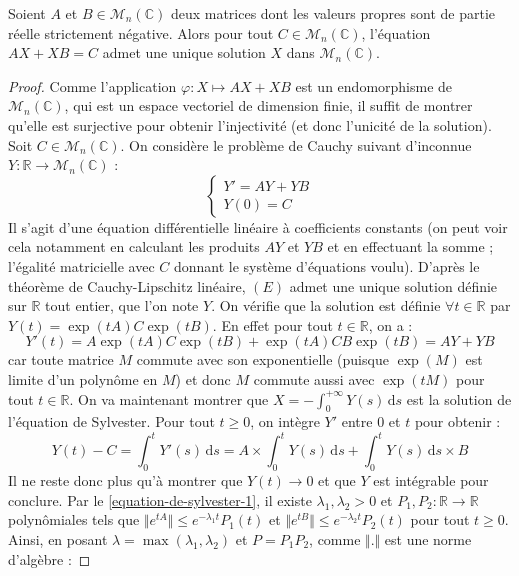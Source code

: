   
  \begin{theorem}
    Soient $A$ et $B \in \mathcal{M}_n(\mathbb{C})$ deux matrices dont les valeurs propres sont de partie réelle strictement négative. Alors pour tout $C \in \mathcal{M}_n(\mathbb{C})$, l'équation $AX + XB = C$ admet une unique solution $X$ dans $\mathcal{M}_n(\mathbb{C})$.
  \end{theorem}
  
  \begin{proof}
    Comme l'application $\varphi : X \mapsto AX + XB$ est un endomorphisme de $\mathcal{M}_n(\mathbb{C})$, qui est un espace vectoriel de dimension finie, il suffit de montrer qu'elle est surjective pour obtenir l'injectivité (et donc l'unicité de la solution). Soit $C \in \mathcal{M}_n(\mathbb{C})$. On considère le problème de Cauchy suivant d'inconnue $Y : \mathbb{R} \rightarrow \mathcal{M}_n(\mathbb{C})$ :
    \[ \begin{cases} Y' = AY + YB \\ Y(0) = C \end{cases} \tag{$E$} \]
    Il s'agit d'une équation différentielle linéaire à coefficients constants (on peut voir cela notamment en calculant les produits $AY$ et $YB$ et en effectuant la somme ; l'égalité matricielle avec $C$ donnant le système d'équations voulu). D'après le théorème de Cauchy-Lipschitz linéaire, $(E)$ admet une unique solution définie sur $\mathbb{R}$ tout entier, que l'on note $Y$.
    \newpar
    On vérifie que la solution est définie $\forall t \in \mathbb{R}$ par $Y(t) = \exp(tA) C \exp(tB)$. En effet pour tout $t \in \mathbb{R}$, on a :
    \[ Y'(t) = A \exp(tA) C \exp(tB) + \exp(tA) CB \exp(tB) = AY + YB \]
    car toute matrice $M$ commute avec son exponentielle (puisque $\exp(M)$ est limite d'un polynôme en $M$) et donc $M$ commute aussi avec $\exp(tM)$ pour tout $t \in \mathbb{R}$.
    \newpar
    On va maintenant montrer que $X = - \int_{0}^{+\infty} Y(s) \, \mathrm{d}s$ est la solution de l'équation de Sylvester. Pour tout $t \geq 0$, on intègre $Y'$ entre $0$ et $t$ pour obtenir :
    \[ Y(t) - C = \int_0^t Y'(s) \, \mathrm{d}s = A \times \int_0^t Y(s) \, \mathrm{d}s + \int_0^t Y(s) \, \mathrm{d}s \times B \]
    Il ne reste donc plus qu'à montrer que $Y(t) \longrightarrow 0$ et que $Y$ est intégrable pour conclure. Par le \cref{equation-de-sylvester-1}, il existe $\lambda_1, \lambda_2 > 0$ et $P_1, P_2 : \mathbb{R} \rightarrow \mathbb{R}$ polynômiales tels que $\Vert e^{tA} \Vert \leq e^{- \lambda_1 t} P_1(t)$ et $\Vert e^{tB} \Vert \leq e^{-\lambda_2 t} P_2(t)$ pour tout $t \geq 0$. Ainsi, en posant $\lambda = \max(\lambda_1, \lambda_2)$ et $P = P_1 P_2$, comme $\Vert . \Vert$ est une norme d'algèbre :

\end{proof}
